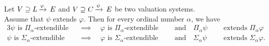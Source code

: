 %
%
\begin{lem}
\label{L:alpha-monotonous}
Let $V \supseteq L\,\smash{\xrightarrow{\varphi}\,E}$
and $V \supseteq C\,\smash{\xrightarrow{\psi}\,E}$
 be two valuation systems.\\
Assume  that
$\psi$ extends $\varphi$.
Then for every ordinal number $\alpha$, we have
\begin{alignat*}{3}
\text{$\psi$ is $\Pi_\alpha$-extendible}
\quad&\implies\quad
\text{$\varphi$ is $\Pi_\alpha$-extendible}
\quad&&\text{and}\quad
\text{$\Pi_\alpha\psi$ }&&\text{extends $\Pi_\alpha\varphi$} \\
\text{$\psi$ is $\Sigma_\alpha$-extendible}
\quad&\implies\quad
\text{$\varphi$ is $\Sigma_\alpha$-extendible}
\quad&&\text{and}\quad
\text{$\Sigma_\alpha\psi$ }&&\text{extends $\Sigma_\alpha\varphi$.}
\end{alignat*}
\end{lem}
